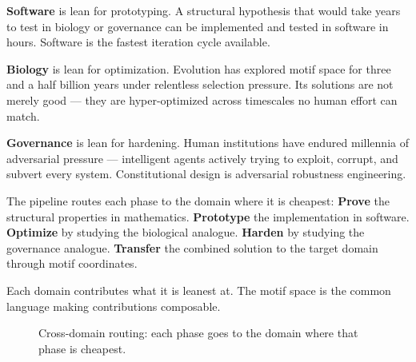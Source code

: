 \documentclass[11pt,a4paper]{article}
\begin{document}
\textbf{Software} is lean for prototyping. A structural hypothesis that would take years to test in biology or governance can be implemented and tested in software in hours. Software is the fastest iteration cycle available.

\textbf{Biology} is lean for optimization. Evolution has explored motif space for three and a half billion years under relentless selection pressure. Its solutions are not merely good --- they are hyper-optimized across timescales no human effort can match.

\textbf{Governance} is lean for hardening. Human institutions have endured millennia of adversarial pressure --- intelligent agents actively trying to exploit, corrupt, and subvert every system. Constitutional design is adversarial robustness engineering.

The pipeline routes each phase to the domain where it is cheapest: \textbf{Prove} the structural properties in mathematics. \textbf{Prototype} the implementation in software. \textbf{Optimize} by studying the biological analogue. \textbf{Harden} by studying the governance analogue. \textbf{Transfer} the combined solution to the target domain through motif coordinates.

Each domain contributes what it is leanest at. The motif space is the common language making contributions composable.

\begin{figure}[ht]
\centering
{}
\caption{Cross-domain routing: each phase goes to the domain where that phase is cheapest.}
\end{figure}
\end{document}
